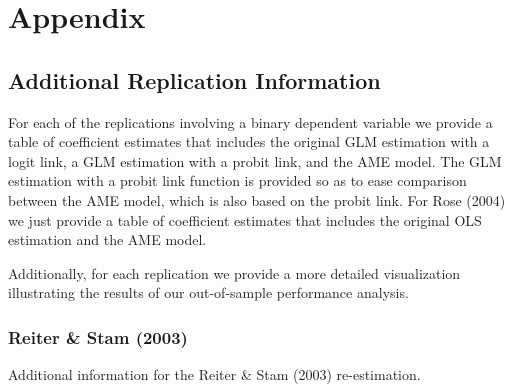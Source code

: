 \clearpage

\renewcommand{\thefigure}{A\arabic{figure}}
\setcounter{figure}{0}
\renewcommand{\thetable}{A.\arabic{table}}
\setcounter{table}{0}
\renewcommand{\thesection}{A.\arabic{section}}
\setcounter{section}{0}

\section*{\textbf{Appendix}}

\subsection*{Additional Replication Information}

For each of the replications involving a binary dependent variable we provide a table of coefficient estimates that includes the original GLM estimation with a logit link, a GLM estimation with a probit link, and the AME model. The GLM estimation with a probit link function is provided so as to ease comparison between the AME model, which is also based on the probit link. For Rose (2004) we just provide a table of coefficient estimates that includes the original OLS estimation and the AME model.

Additionally, for each replication we provide a more detailed visualization illustrating the results of our out-of-sample performance analysis. %

\clearpage
\subsubsection*{Reiter \& Stam (2003)}

Additional information for the Reiter \& Stam (2003) re-estimation.


\FloatBarrier

